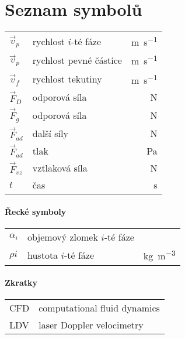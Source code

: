 \chapter*{Seznam symbolů}

\renewcommand\arraystretch{1.5}
\begin{tabularx}{\textwidth}{@{}p{1.0cm} X r@{}}
$\vec{v}_{p}$ & rychlost $i$-té fáze & \si{\meter\per\second} \\
$\vec{v}_{p}$ & rychlost pevné částice & \si{\meter\per\second} \\
$\vec{v}_{f}$ & rychlost tekutiny & \si{\meter\per\second}  \\
$\vec{F}_{D}$ & odporová síla & \si{\newton} \\
$\vec{F}_{g}$ & odporová síla & \si{\newton} \\
$\vec{F}_{ad}$ & další síly & \si{\newton} \\
$\vec{F}_{ad}$ & tlak & \si{\pascal} \\
$\vec{F}_{vz}$ & vztlaková síla & \si{\newton} \\
$t$ & čas & \si{\second} \\


\end{tabularx}


\subsubsection*{Řecké symboly}
\begin{tabularx}{\textwidth}{@{}p{1.0cm} X r@{}}
$\alpha_{i}$ & objemový zlomek $i$-té fáze & \\
$\rho{i}$ & hustota $i$-té fáze & \si{\kilogram\per\cubic\meter} \\
\end{tabularx}


\subsubsection*{Zkratky}
\begin{tabularx}{\textwidth}{@{}p{1.0cm} X }
CFD & computational fluid dynamics  \\
LDV & laser Doppler velocimetry  \\
\end{tabularx}
